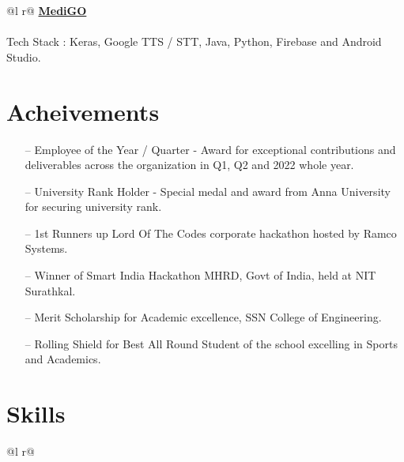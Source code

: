 \documentclass[a4paper,10.75pt]{article}
\begin{document}
\begin{tabularx}{\linewidth}{ @{}l r@{} }
{\href{https://devfolio.co/projects/medigo} { \color{black} {\bf MediGO}}} \\[3.75pt]
 \\ {Tech Stack : Keras, Google TTS / STT, Java, Python, Firebase and Android Studio.}
\end{tabularx}

\section{Acheivements}
       \begin{itemize}[nosep,after=\strut, leftmargin=1em, itemsep=3pt]
        \item[--] Employee of the Year / Quarter - Award for exceptional contributions and deliverables across the organization in Q1, Q2 and 2022 whole year.
      \item[--] University Rank Holder - Special medal and award from Anna University for securing university rank.
        \item[--] 1st Runners up Lord Of The Codes corporate hackathon hosted by Ramco Systems.        \item[--] Winner of Smart India Hackathon MHRD, Govt of India, held at NIT Surathkal.
        \item[--] Merit Scholarship for Academic excellence, SSN College of Engineering.
        \item[--] Rolling Shield for Best All Round Student of the school excelling in Sports and Academics.
    \end{itemize}



\section{Skills}

\begin{tabularx}{\linewidth}{ @{}l r@{} }
\end{tabularx}
\end{document}
